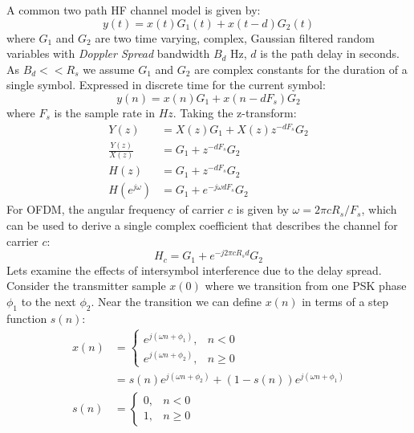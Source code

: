 \documentclass{article}
\begin{document}
A common two path HF channel model \cite{itu1487} is given by:
\begin{equation}
y(t) = x(t)G_1(t) + x(t-d)G_2(t)
\end{equation}
where $G_1$ and $G_2$ are two time varying, complex, Gaussian filtered random variables with \emph{Doppler Spread} bandwidth $B_d$ Hz, $d$ is the path delay in seconds. As $B_d<< R_s$ we assume $G_1$ and $G_2$ are complex constants for the duration of a single symbol. Expressed in discrete time for the current symbol:
\begin{equation}
\label{eq:hf_model_time}
y(n) = x(n)G_1 + x(n-dF_s)G_2
\end{equation}
where $F_s$ is the sample rate in $\si{Hz}$.  Taking the z-transform:
\begin{equation}
\begin{split}
Y(z) &= X(z)G_1+X(z)z^{-dF_s}G_2 \\
\frac{Y(z)}{X(z)} &= G_1+z^{-dF_s}G_2 \\
H(z) &= G_1+z^{-dF_s}G_2 \\
H(e^{j \omega}) &= G_1+e^{-j \omega d F_s}G_2
\end{split}
\end{equation}
For OFDM, the angular frequency of carrier $c$ is given by $\omega=2 \pi c R_s/F_s$, which can be used to derive a single complex coefficient that describes the channel for carrier $c$:
\begin{equation}
\label{eq:hf_model_freq}
H_c = G_1+e^{-j 2 \pi c R_s d}G_2
\end{equation} 
Lets examine the effects of intersymbol interference due to the delay spread.  Consider the transmitter sample $x(0)$ where we transition from one PSK phase $\phi_1$ to the next $\phi_2$.  Near the transition we can define $x(n)$ in terms of a step function $s(n)$:
\begin{equation}
\begin{split}
x(n) &=
	\begin{cases}
      e^{j (\omega n + \phi_1)}, & n < 0 \\
      e^{j (\omega n + \phi_2)}, & n \ge 0
	\end{cases} \\
	&= s(n)e^{j (\omega n + \phi_2)} + (1-s(n))e^{j (\omega n + \phi_1)}  \\
s(n) &=
	\begin{cases}
      0, & n < 0 \\
      1, & n \ge 0
	\end{cases}
\end{split}
\end{equation}
\end{document}
